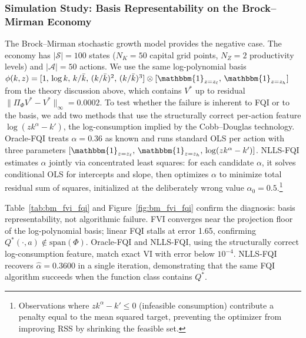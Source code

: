 \subsubsection{Simulation Study: Basis Representability on the Brock--Mirman Economy}
\label{sec:bm_fvi_fqi}

The Brock--Mirman stochastic growth model \citep{brockmirman1972} provides the negative case. The economy has $|\mathcal{S}| = 100$ states ($N_K = 50$ capital grid points, $N_Z = 2$ productivity levels) and $|\mathcal{A}| = 50$ actions. We use the same log-polynomial basis $\phi(k,z) = [1,\, \log k,\, k/\bar{k},\, (k/\bar{k})^2,\, (k/\bar{k})^3] \otimes [\mathbbm{1}_{z = z_\ell},\, \mathbbm{1}_{z = z_h}]$ from the theory discussion above, which contains $V^*$ up to residual $\|\Pi_\Phi V^* - V^*\|_\infty = 0.0002$. To test whether the failure is inherent to FQI or to the basis, we add two methods that use the structurally correct per-action feature $\log(z k^\alpha - k')$, the log-consumption implied by the Cobb--Douglas technology. Oracle-FQI treats $\alpha = 0.36$ as known and runs standard OLS per action with three parameters $[\mathbbm{1}_{z = z_\ell},\, \mathbbm{1}_{z = z_h},\, \log(z k^\alpha - k')]$. NLLS-FQI estimates $\alpha$ jointly via concentrated least squares: for each candidate $\alpha$, it solves conditional OLS for intercepts and slope, then optimizes $\alpha$ to minimize total residual sum of squares, initialized at the deliberately wrong value $\alpha_0 = 0.5$.\footnote{Observations where $z k^\alpha - k' \leq 0$ (infeasible consumption) contribute a penalty equal to the mean squared target, preventing the optimizer from improving RSS by shrinking the feasible set.}

Table~\ref{tab:bm_fvi_fqi} and Figure~\ref{fig:bm_fvi_fqi} confirm the diagnosis: basis representability, not algorithmic failure. FVI converges near the projection floor of the log-polynomial basis; linear FQI stalls at error 1.65, confirming $Q^*(\cdot, a) \notin \mathrm{span}(\Phi)$. Oracle-FQI and NLLS-FQI, using the structurally correct log-consumption feature, match exact VI with error below $10^{-4}$. NLLS-FQI recovers $\hat{\alpha} = 0.3600$ in a single iteration, demonstrating that the same FQI algorithm succeeds when the function class contains $Q^*$.

\begin{table}[h]
\centering
\small

\caption{Convergence metrics for five methods on the Brock--Mirman economy ($N_K = 50$, $N_Z = 2$, $\gamma = 0.96$). Policy agreement is measured against the closed-form optimal policy $k' = \alpha \beta z k^\alpha$.}
\label{tab:bm_fvi_fqi}
\end{table}

